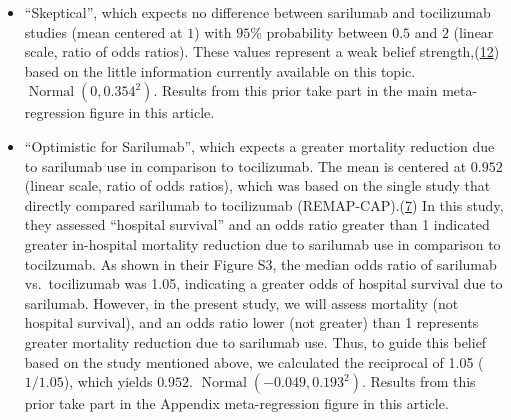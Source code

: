 \documentclass[
  12pt,
]{article}
\begin{document}
\begin{itemize}
\item
  ``Skeptical'', which expects no difference between sarilumab and
  tocilizumab studies (mean centered at \(1\)) with \(95\%\) probability
  between \(0.5\) and \(2\) (linear scale, ratio of odds ratios). These
  values represent a weak belief
  strength,(\protect\hyperlink{ref-zampieri2021}{12}) based on the
  little information currently available on this topic.
  \(\operatorname{Normal}(0, 0.354^2)\). Results from this prior take
  part in the main meta-regression figure in this article.
\item
  ``Optimistic for Sarilumab'', which expects a greater mortality
  reduction due to sarilumab use in comparison to tocilizumab. The mean
  is centered at \(0.952\) (linear scale, ratio of odds ratios), which
  was based on the single study that directly compared sarilumab to
  tocilizumab (REMAP-CAP).(\protect\hyperlink{ref-zotero-3144}{7}) In
  this study, they assessed ``hospital survival'' and an odds ratio
  greater than 1 indicated greater in-hospital mortality reduction due
  to sarilumab use in comparison to tocilzumab. As shown in their Figure
  S3, the median odds ratio of sarilumab vs.~tocilizumab was 1.05,
  indicating a greater odds of hospital survival due to sarilumab.
  However, in the present study, we will assess mortality (not hospital
  survival), and an odds ratio lower (not greater) than 1 represents
  greater mortality reduction due to sarilumab use. Thus, to guide this
  belief based on the study mentioned above, we calculated the
  reciprocal of 1.05 (\(1/1.05\)), which yields \(0.952\).
  \(\operatorname{Normal}(-0.049, 0.193^2)\). Results from this prior
  take part in the Appendix meta-regression figure in this article.


\end{itemize}
\end{document}

